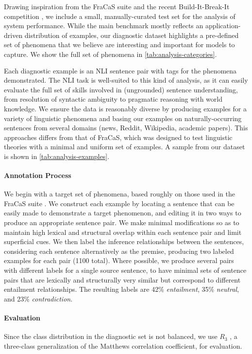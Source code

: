 Drawing inspiration from the FraCaS suite \citep{cooper96fracas} and the recent Build-It-Break-It competition \citep{ettinger2017towards}, we include a small, manually-curated test set for the analysis of system performance. While the main benchmark mostly reflects an application-driven distribution of examples, 
our diagnostic dataset highlights a pre-defined set of phenomena that we believe are interesting and important for models to capture. We show the full set of phenomena in \autoref{tab:analysis-categories}.

Each diagnostic example is an NLI sentence pair with tags for the phenomena demonstrated.
The NLI task is well-suited to this kind of analysis, as it can easily evaluate the full set of skills involved in (ungrounded) sentence understanding, from resolution of syntactic ambiguity to pragmatic reasoning with world knowledge.
We ensure the data is reasonably diverse by producing examples for a variety of linguistic phenomena and basing our examples on naturally-occurring sentences from several domains (news, Reddit, Wikipedia, academic papers).
This approaches differs from that of FraCaS, which was designed to test linguistic theories with a minimal and uniform set of examples.
A sample from our dataset is shown in \autoref{tab:analysis-examples}. 

\paragraph{Annotation Process} 
We begin with a target set of phenomena, based roughly on those used in the FraCaS suite \citep{cooper96fracas}.
We construct each example by locating a sentence that can be easily made to demonstrate a target phenomenon, and editing it in two ways to produce an appropriate sentence pair.
We make minimal modifications so as to maintain high lexical and structural overlap within each sentence pair and limit superficial cues.
We then label the inference relationships  between the sentences, considering each sentence alternatively as the premise, producing two labeled examples for each pair (1100 total).
Where possible, we produce several pairs with different labels for a single source sentence, to have minimal sets of sentence pairs that are lexically and structurally very similar but correspond to different entailment relationships.
The resulting labels are 42\% \textit{entailment}, 35\% \textit{neutral}, and 23\% \textit{contradiction}.

\paragraph{Evaluation}
Since the class distribution in the diagnostic set is not balanced, we use \(R_3\) \citep{gorodkin2004Rk}, a three-class generalization of the Matthews correlation coefficient, for evaluation.

